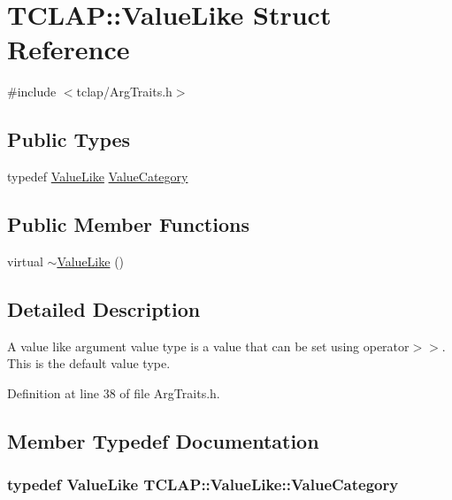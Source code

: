 \hypertarget{struct_t_c_l_a_p_1_1_value_like}{}\section{T\+C\+L\+A\+P\+:\+:Value\+Like Struct Reference}
\label{struct_t_c_l_a_p_1_1_value_like}


{\ttfamily \#include $<$tclap/\+Arg\+Traits.\+h$>$}

\subsection*{Public Types}
\begin{DoxyCompactItemize}
\item 
typedef \hyperlink{struct_t_c_l_a_p_1_1_value_like}{Value\+Like} \hyperlink{struct_t_c_l_a_p_1_1_value_like_a26e6d3b8c4a608ecebe7404e42fbecf9}{Value\+Category}
\end{DoxyCompactItemize}
\subsection*{Public Member Functions}
\begin{DoxyCompactItemize}
\item 
virtual \hyperlink{struct_t_c_l_a_p_1_1_value_like_aef7da69a6268964f450cf4c12e614ba7}{$\sim$\+Value\+Like} ()
\end{DoxyCompactItemize}


\subsection{Detailed Description}
A value like argument value type is a value that can be set using operator$>$$>$. This is the default value type. 

Definition at line 38 of file Arg\+Traits.\+h.



\subsection{Member Typedef Documentation}
\hypertarget{struct_t_c_l_a_p_1_1_value_like_a26e6d3b8c4a608ecebe7404e42fbecf9}{}
\subsubsection[{Value\+Category}]{\setlength{\rightskip}{0pt plus 5cm}typedef {\bf Value\+Like} {\bf T\+C\+L\+A\+P\+::\+Value\+Like\+::\+Value\+Category}}\label{struct_t_c_l_a_p_1_1_value_like_a26e6d3b8c4a608ecebe7404e42fbecf9}


